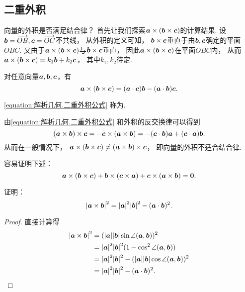 \subsection{二重外积}
向量的外积是否满足结合律？
首先让我们探索\(\boldsymbol{a}\times(\boldsymbol{b}\times\boldsymbol{c})\)的计算结果.
设\(\boldsymbol{b}=\overrightarrow{OB},\boldsymbol{c}=\overrightarrow{OC}\)不共线，
从外积的定义可知，
\(\boldsymbol{b}\times\boldsymbol{c}\)垂直于由\(\boldsymbol{b},\boldsymbol{c}\)确定的平面\(OBC\).
又由于\(\boldsymbol{a}\times(\boldsymbol{b}\times\boldsymbol{c})\)与\(\boldsymbol{b}\times\boldsymbol{c}\)垂直，
因此\(\boldsymbol{a}\times(\boldsymbol{b}\times\boldsymbol{c})\)在平面\(OBC\)内，
从而\(\boldsymbol{a}\times(\boldsymbol{b}\times\boldsymbol{c}) = k_1 \boldsymbol{b} + k_2 \boldsymbol{c}\)，
其中\(k_1,k_2\)待定.

\begin{theorem}
对任意向量\(\boldsymbol{a},\boldsymbol{b},\boldsymbol{c}\)，有
\begin{equation}\label{equation:解析几何.二重外积公式}
	\boldsymbol{a}\times(\boldsymbol{b}\times\boldsymbol{c})
	= (\boldsymbol{a}\cdot\boldsymbol{c}) \boldsymbol{b}
	- (\boldsymbol{a}\cdot\boldsymbol{b}) \boldsymbol{c}.
\end{equation}
\end{theorem}
\cref{equation:解析几何.二重外积公式}
称为.

由\cref{equation:解析几何.二重外积公式}
和外积的反交换律可以得到\[
	(\boldsymbol{a}\times\boldsymbol{b})\times\boldsymbol{c}
	= -\boldsymbol{c}\times(\boldsymbol{a}\times\boldsymbol{b})
	= -(\boldsymbol{c}\cdot\boldsymbol{b}) \boldsymbol{a}
	+ (\boldsymbol{c}\cdot\boldsymbol{a}) \boldsymbol{b}.
\]
从而在一般情况下，
\(\boldsymbol{a}\times(\boldsymbol{b}\times\boldsymbol{c}) \neq (\boldsymbol{a}\times\boldsymbol{b})\times\boldsymbol{c}\)，
即向量的外积不适合结合律.

容易证明下述：
\begin{equation}\label{equation:解析几何.雅克比等式}
	\boldsymbol{a}\times(\boldsymbol{b}\times\boldsymbol{c})
	+ \boldsymbol{b}\times(\boldsymbol{c}\times\boldsymbol{a})
	+ \boldsymbol{c}\times(\boldsymbol{a}\times\boldsymbol{b})
	= \boldsymbol{0}.
\end{equation}

\begin{example}
证明：\[
	\abs{\boldsymbol{a}\times\boldsymbol{b}}^2
	= \abs{\boldsymbol{a}}^2 \abs{\boldsymbol{b}}^2 - (\boldsymbol{a}\cdot\boldsymbol{b})^2.
\]
\begin{proof}
\def\t{\angle(\vb{a},\vb{b})}%
直接计算得\begin{align*}
	\abs{\vb{a}\times\vb{b}}^2
	&= (\abs{\vb{a}}\abs{\vb{b}}\sin\t)^2 \\
	&= \abs{\vb{a}}^2 \abs{\vb{b}}^2 (1-\cos^2\t) \\
	&= \abs{\vb{a}}^2 \abs{\vb{b}}^2
	- (\abs{\vb{a}}\abs{\vb{b}}\cos\t)^2 \\
	&= \abs{\vb{a}}^2 \abs{\vb{b}}^2
	- (\vb{a}\cdot\vb{b})^2.
	\qedhere
\end{align*}
\end{proof}
\end{example}

